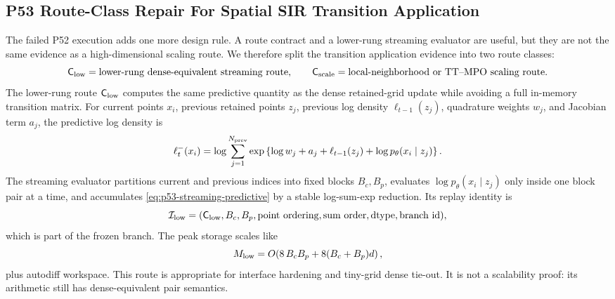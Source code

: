 \documentclass[11pt]{article}
\numberwithin{equation}{section}
\begin{document}
\subsection{P53 Route-Class Repair For Spatial SIR Transition Application}
\label{sec:p53-spatial-sir-route-class-repair}

The failed P52 execution adds one more design rule.  A route contract and a
lower-rung streaming evaluator are useful, but they are not the same evidence as
a high-dimensional scaling route.  We therefore split the transition
application evidence into two route classes:
\begin{equation}
    \mathsf C_{\rm low}
    =
    \text{lower-rung dense-equivalent streaming route},
    \qquad
    \mathsf C_{\rm scale}
    =
    \text{local-neighborhood or TT--MPO scaling route}.
    \label{eq:p53-route-classes}
\end{equation}
The lower-rung route \(\mathsf C_{\rm low}\) computes the same predictive
quantity as the dense retained-grid update while avoiding a full in-memory
transition matrix.  For current points \(x_i\), previous retained points
\(z_j\), previous log density \(\ell_{t-1}(z_j)\), quadrature weights \(w_j\),
and Jacobian term \(a_j\), the predictive log density is
\begin{equation}
    \ell^-_t(x_i)
    =
    \log\sum_{j=1}^{N_{\rm prev}}
    \exp\left\{
      \log w_j+a_j+\ell_{t-1}(z_j)
      +\log p_\theta(x_i\mid z_j)
    \right\}.
    \label{eq:p53-streaming-predictive}
\end{equation}
The streaming evaluator partitions current and previous indices into fixed
blocks \(B_c,B_p\), evaluates \(\log p_\theta(x_i\mid z_j)\) only inside one
block pair at a time, and accumulates \eqref{eq:p53-streaming-predictive} by a
stable log-sum-exp reduction.  Its replay identity is
\begin{equation}
    \mathcal I_{\rm low}
    =
    (\mathsf C_{\rm low}, B_c, B_p, \text{point ordering},
     \text{sum order}, \text{dtype}, \text{branch id}),
    \label{eq:p53-low-route-identity}
\end{equation}
which is part of the frozen branch.  The peak storage scales like
\begin{equation}
    M_{\rm low}
    =
    O\!\left(8\,B_cB_p+8(B_c+B_p)d\right),
    \label{eq:p53-low-route-memory}
\end{equation}
plus autodiff workspace.  This route is appropriate for interface hardening and
tiny-grid dense tie-out.  It is not a scalability proof: its arithmetic still
has dense-equivalent pair semantics.
\end{document}
